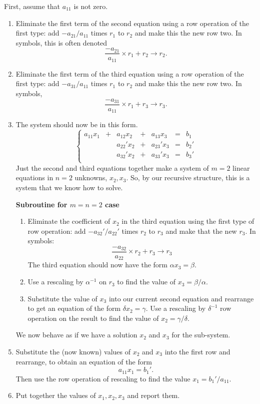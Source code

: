 \documentclass[00-livre-main.tex]{subfiles}
\begin{document}
First, assume that $a_{11}$ is not zero. 

\begin{enumerate}
\item Eliminate the first term of the second equation using a row operation of the first type: add $-a_{21}/a_{11}$ times $r_1$ to $r_2$ and make this the new row two. In symbols, this is often denoted
\[
\frac{-a_{21}}{a_{11}} \times r_1 + r_2 \rightarrow r_2.
\]

\item Eliminate the first term of the third equation using a row operation of the first type: add $-a_{31}/a_{11}$ times $r_1$ to $r_2$ and make this the new row two. In symbols, 
\[
\frac{-a_{31}}{a_{11}} \times r_1 + r_3 \rightarrow r_3.
\]

\item The system should now be in this form.
\[
\left\{\begin{array}{rrrrrrr}
a_{11}x_1 & + & a_{12} x_2 & + & a_{13}x_3 & = & b_1 \\
 &  & a_{22}' x_2 & + & a_{23}'x_3 & = & b_2' \\
 &  & a_{32}' x_2 & + & a_{33}'x_3 & = & b_3' \\
\end{array}\right.
\]
Just the second and third equations together make a system of $m=2$ linear equations in $n=2$ unknowns, $x_2, x_3$. So, by our recursive structure, this is a system that we know how to solve. 

\item[\textbf{Subroutine for $m=n=2$ case}] { \ }\\
\begin{enumerate}
\item Eliminate the coefficient of $x_2$ in the third equation using the first type of row operation: add $-a_{32}'/a_{22}'$ times $r_2$ to $r_3$ and make that the new $r_3$.
In symbols:
\[
\frac{-a_{32}}{a_{22}}\times r_2 + r_3 \rightarrow r_3
\]
The third equation should now have the form $\alpha x_3 = \beta$.


\item Use a rescaling by $\alpha^{-1}$ on $r_3$ to find the value of $x_3 = \beta/\alpha$.

\item Substitute the value of $x_3$ into our current second equation and rearrange to get an equation of the form $\delta x_2 = \gamma$. Use a rescaling by $\delta^{-1}$ row operation on the result to find the value of $x_2 = \gamma/\delta$.
\end{enumerate}

We now behave as if we have a solution $x_2$ and $x_3$ for the sub-system.

\item Substitute the (now known) values of $x_2$ and $x_3$ into the first row and rearrange, to obtain an equation of the form
\[
a_{11} x_1 = b_1'.
\]
Then use the row operation of rescaling to find the value $x_1 = b_1'/a_{11}$.

\item Put together the values of $x_1, x_2, x_3$ and report them.
\end{enumerate}
\end{document}
